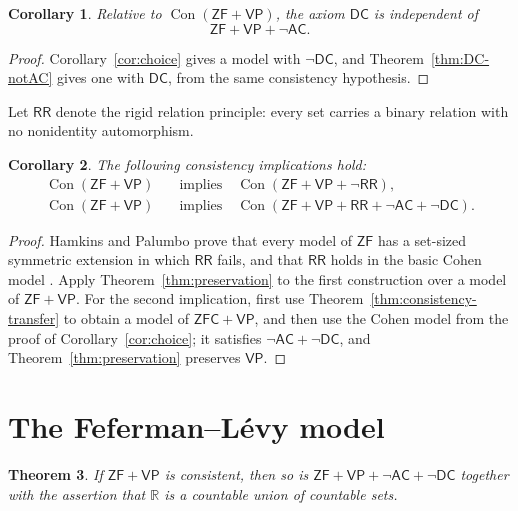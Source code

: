 \documentclass[11pt,a4paper]{amsart}
\newcommand{\VP}{\mathsf{VP}}
\newcommand{\AC}{\mathsf{AC}}
\newcommand{\ZF}{\mathsf{ZF}}
\newcommand{\ZFC}{\mathsf{ZFC}}
\newcommand{\Con}{\operatorname{Con}}
\newcommand{\DC}{\mathsf{DC}}
\newcommand{\RR}{\mathsf{RR}}
\theoremstyle{plain}
\newtheorem{theorem}{Theorem}[section]
\newtheorem{corollary}[theorem]{Corollary}
\theoremstyle{definition}
\theoremstyle{remark}
\begin{document}
\begin{corollary}\label{cor:DC-independent}
Relative to $\Con(\ZF+\VP)$, the axiom $\DC$ is independent of
\[
\ZF+\VP+\neg\AC.
\]
\end{corollary}

\begin{proof}
Corollary~\ref{cor:choice} gives a model with $\neg\DC$, and Theorem~\ref{thm:DC-notAC} gives one with $\DC$, from the same consistency hypothesis.
\end{proof}

Let $\RR$ denote the rigid relation principle: every set carries a binary relation with no nonidentity automorphism.

\begin{corollary}\label{cor:RR}
The following consistency implications hold:
\[
\begin{aligned}
\Con(\ZF+\VP)&\quad\text{implies}\quad\Con(\ZF+\VP+\neg\RR),\\
\Con(\ZF+\VP)&\quad\text{implies}\quad
\Con(\ZF+\VP+\RR+\neg\AC+\neg\DC).
\end{aligned}
\]
\end{corollary}

\begin{proof}
Hamkins and Palumbo prove that every model of $\ZF$ has a set-sized symmetric extension in which $\RR$ fails, and that $\RR$ holds in the basic Cohen model \cite[Theorems~5 and~6]{HamkinsPalumbo}.  Apply Theorem~\ref{thm:preservation} to the first construction over a model of $\ZF+\VP$.  For the second implication, first use Theorem~\ref{thm:consistency-transfer} to obtain a model of $\ZFC+\VP$, and then use the Cohen model from the proof of Corollary~\ref{cor:choice}; it satisfies $\neg\AC+\neg\DC$, and Theorem~\ref{thm:preservation} preserves $\VP$.
\end{proof}
\endgroup

\begingroup

\section{The Feferman--L\'evy model}\label{sec:FL}

\begin{theorem}\label{thm:FL}
If $\ZF+\VP$ is consistent, then so is $\ZF+\VP+\neg\AC+\neg\DC$ together with the assertion that $\mathbb R$ is a countable union of countable sets.
\end{theorem}
\end{document}
